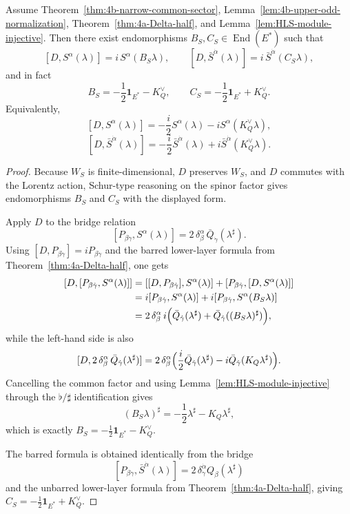 \begin{lemma}
\label{lem:4b-upper-D-normal-form}
Assume Theorem~\ref{thm:4b-narrow-common-sector},
Lemma~\ref{lem:4b-upper-odd-normalization},
Theorem~\ref{thm:4a-Delta-half}, and
Lemma~\ref{lem:HLS-module-injective}. Then there exist endomorphisms
\(B_S,C_S\in\operatorname{End}(E^*)\) such that
\[
  [D,S^\alpha(\lambda)]
  =
  i\,S^\alpha(B_S\lambda),
  \qquad
  [D,\bar S^{\dot\alpha}(\lambda)]
  =
  i\,\bar S^{\dot\alpha}(C_S\lambda),
\]
and in fact
\[
  B_S=-\frac12\mathbf 1_{E^*}-K_Q^\vee,
  \qquad
  C_S=-\frac12\mathbf 1_{E^*}+K_Q^\vee.
\]
Equivalently,
\[
  [D,S^\alpha(\lambda)]
  =
  -\frac{i}{2}S^\alpha(\lambda)-iS^\alpha(K_Q^\vee\lambda),
\]
\[
  [D,\bar S^{\dot\alpha}(\lambda)]
  =
  -\frac{i}{2}\bar S^{\dot\alpha}(\lambda)+i\bar S^{\dot\alpha}(K_Q^\vee\lambda).
\]
\end{lemma}

\begin{proof}
Because \(W_S\) is finite-dimensional, \(D\) preserves \(W_S\), and \(D\)
commutes with the Lorentz action, Schur-type reasoning on the spinor factor gives
endomorphisms \(B_S\) and \(C_S\) with the displayed form.

Apply \(D\) to the bridge relation
\[
  [P_{\beta\dot\gamma},S^\alpha(\lambda)]
  =
  2\,\delta_\beta^\alpha\,\bar Q_{\dot\gamma}(\lambda^\sharp).
\]
Using \([D,P_{\beta\dot\gamma}]=iP_{\beta\dot\gamma}\) and the barred lower-layer
formula from Theorem~\ref{thm:4a-Delta-half}, one gets
\[
\begin{aligned}
[D,[P_{\beta\dot\gamma},S^\alpha(\lambda)]]
&=
[[D,P_{\beta\dot\gamma}],S^\alpha(\lambda)]
+[P_{\beta\dot\gamma},[D,S^\alpha(\lambda)]]\\
&=
i[P_{\beta\dot\gamma},S^\alpha(\lambda)]
+i[P_{\beta\dot\gamma},S^\alpha(B_S\lambda)]\\
&=
2\,\delta_\beta^\alpha\,i\Bigl(
\bar Q_{\dot\gamma}(\lambda^\sharp)+
\bar Q_{\dot\gamma}((B_S\lambda)^\sharp)
\Bigr),
\end{aligned}
\]
while the left-hand side is also
\[
  [D,2\,\delta_\beta^\alpha\,\bar Q_{\dot\gamma}(\lambda^\sharp)]
  =
  2\,\delta_\beta^\alpha\Bigl(
  \frac{i}{2}\bar Q_{\dot\gamma}(\lambda^\sharp)
  -i\bar Q_{\dot\gamma}(K_Q\lambda^\sharp)
  \Bigr).
\]
Cancelling the common factor and using Lemma~\ref{lem:HLS-module-injective}
through the \(\flat/\sharp\) identification gives
\[
  (B_S\lambda)^\sharp
  =
  -\frac12\lambda^\sharp-K_Q\lambda^\sharp,
\]
which is exactly \(B_S=-\tfrac12\mathbf 1_{E^*}-K_Q^\vee\).

The barred formula is obtained identically from the bridge
\[
  [P_{\beta\dot\gamma},\bar S^{\dot\alpha}(\lambda)]
  =
  2\,\delta_{\dot\gamma}^{\dot\alpha}Q_\beta(\lambda^\sharp)
\]
and the unbarred lower-layer formula from Theorem~\ref{thm:4a-Delta-half},
giving \(C_S=-\tfrac12\mathbf 1_{E^*}+K_Q^\vee\).
\end{proof}

